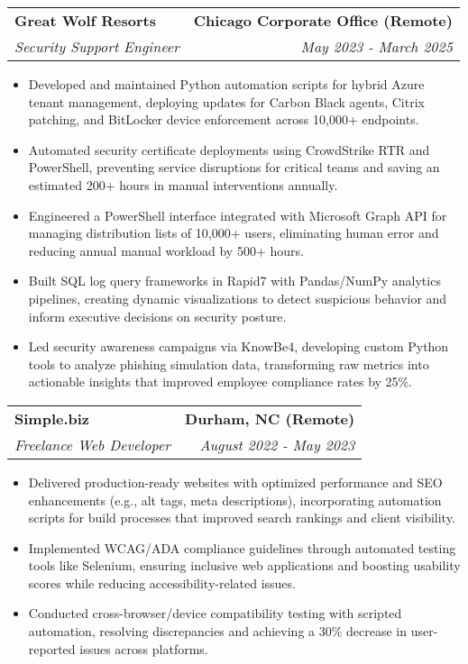\documentclass[letterpaper,10pt]{article}
\makeatletter
\newcommand{\resumeItem}[1]{\item\small{#1}}
\newcommand{\resumeItemListStart}{\begin{itemize}}
\newcommand{\resumeItemListEnd}{\end{itemize}\vspace{-2pt}}
\newcommand{\resumeSubheading}[4]{%
  \vspace{-2pt}\item
  \begin{tabular*}{\textwidth}[t]{l@{\extracolsep{\fill}}r}
    \textbf{\large #1} & \textbf{\small #2} \\
    \textit{\large #3} & \textit{\small #4} \\
  \end{tabular*}\vspace{-2pt}
}
\makeatother
\begin{document}
\resumeSubheading
  {Great Wolf Resorts}{Chicago Corporate Office (Remote)}
  {Security Support Engineer}{May 2023 - March 2025}
\vspace{2pt}
\resumeItemListStart
  \resumeItem{Developed and maintained Python automation scripts for hybrid Azure tenant management, deploying updates for Carbon Black agents, Citrix patching, and BitLocker device enforcement across 10,000+ endpoints.}
  \resumeItem{Automated security certificate deployments using CrowdStrike RTR and PowerShell, preventing service disruptions for critical teams and saving an estimated 200+ hours in manual interventions annually.}
  \resumeItem{Engineered a PowerShell interface integrated with Microsoft Graph API for managing distribution lists of 10,000+ users, eliminating human error and reducing annual manual workload by 500+ hours.}
  \resumeItem{Built SQL log query frameworks in Rapid7 with Pandas/NumPy analytics pipelines, creating dynamic visualizations to detect suspicious behavior and inform executive decisions on security posture.}
  \resumeItem{Led security awareness campaigns via KnowBe4, developing custom Python tools to analyze phishing simulation data, transforming raw metrics into actionable insights that improved employee compliance rates by 25\%.}
\resumeItemListEnd
\vspace{6pt}
\resumeSubheading
  {Simple.biz}{Durham, NC (Remote)}
  {Freelance Web Developer}{August 2022 - May 2023}
\vspace{2pt}
\resumeItemListStart
  \resumeItem{Delivered production-ready websites with optimized performance and SEO enhancements (e.g., alt tags, meta descriptions), incorporating automation scripts for build processes that improved search rankings and client visibility.}
  \resumeItem{Implemented WCAG/ADA compliance guidelines through automated testing tools like Selenium, ensuring inclusive web applications and boosting usability scores while reducing accessibility-related issues.}
  \resumeItem{Conducted cross-browser/device compatibility testing with scripted automation, resolving discrepancies and achieving a 30\% decrease in user-reported issues across platforms.}
\resumeItemListEnd
\vspace{8pt}
\end{document}
